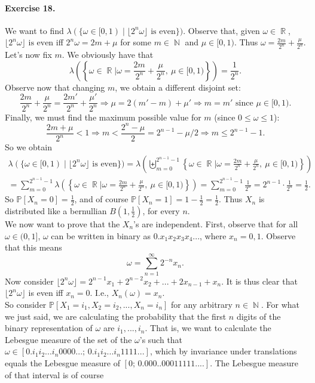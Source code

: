 \documentclass[12pt,a4paper]{report}
\theoremstyle{definition}
\theoremstyle{num.custom-title}
\DeclareMathOperator{\N}{\mathbb{N}}
\DeclareMathOperator{\R}{\mathbb{R}}
\DeclareMathOperator{\imp}{\Rightarrow}
\renewcommand{\P}{\mathbb{P}}
\renewcommand{\1}{\mathbbm{1}}
\begin{document}
\paragraph{Exercise 18.} We want to find $\lambda(\{\omega \in [0,1) \mid \lfloor 2^n \omega \rfloor \text{ is even}\})$. Observe that, given $\omega \in \R$, $\lfloor 2^n \omega \rfloor \text{ is even}$ iff $2^n \omega = 2m + \mu$ for some $m \in \N$ and $\mu \in [0,1)$. Thus $\omega = \frac{2m}{2^n} + \frac{\mu}{2^n}$. Let's now fix $m$. We obviously have that 
\[
\lambda \left( \left\{ \omega \in \R \Big | \omega = \frac{2m}{2^n} + \frac{\mu}{2^n}, \ \mu \in [0,1) \right\} \right) = \frac{1}{2^n}.
\]
Observe now that changing $m$, we obtain a different disjoint set:
\[
\frac{2m}{2^n} + \frac{\mu}{2^n} = \frac{2m'}{2^n} + \frac{\mu'}{2^n} \imp \mu = 2(m'-m) + \mu' \imp m=m' \text{ since } \mu \in [0,1).
\]
Finally, we must find the maximum possible value for $m$ (since $0 \leq \omega \leq 1$): 
\[
\frac{2m+\mu}{2^n} < 1 \imp m < \frac{2^n-\mu}{2} = 2^{n-1}-\mu/2 \imp m \leq 2^{n-1}-1.
\]
So we obtain 
\begin{multline*}
\lambda(\{\omega \in [0,1) \mid \lfloor 2^n \omega \rfloor \text{ is even}\}) = \lambda \left( \biguplus_{m=0}^{2^{n-1}-1} \left\{ \omega \in \R \Big | \omega = \frac{2m}{2^n} + \frac{\mu}{2^n}, \ \mu \in [0,1) \right\} \right)\\
= \sum_{m=0}^{2^{n-1}-1} \lambda \left( \left\{ \omega \in \R \Big | \omega = \frac{2m}{2^n} + \frac{\mu}{2^n}, \ \mu \in [0,1) \right\} \right) = \sum_{m=0}^{2^{n-1}-1} \frac{1}{2^n} = 2^{n-1} \cdot \frac{1}{2^n} = \frac{1}{2}.
\end{multline*}
So $\P[X_n = 0] = \frac{1}{2}$, and of course $\P[X_n = 1] = 1-\frac{1}{2} = \frac{1}{2}$. Thus $X_n$ is distributed like a bernullian $B(1,\frac{1}{2})$, for every $n$.\\
We now want to prove that the $X_n$'s are independent. First, observe that for all $\omega \in (0,1]$, $\omega$ can be written in binary as $0.x_1x_2x_3x_4...$, where $x_n=0,1$. Observe that this means 
\[
\omega = \sum_{n=1}^\infty 2^{-n} x_n.
\]
Now consider $\lfloor 2^n\omega \rfloor = 2^{n-1} x_1 + 2^{n-2} x_2 + ... + 2 x_{n-1} + x_n$. It is thus clear that $\lfloor 2^n\omega \rfloor$ is even iff $x_n=0$. I.e., $X_n(\omega) = x_n$.\\
So consider $\P[X_1=i_1, X_2=i_2,...,X_n=i_n]$ for any arbitrary $n \in \N$. For what we just said, we are calculating the probability that the first $n$ digits of the binary representation of $\omega$ are $i_1,...,i_n$. That is, we want to calculate the Lebesgue measure of the set of the $\omega$'s such that $\omega \in [0.i_1i_2...i_n0000...; \, 0.i_1i_2...i_n1111...]$, which by invariance under translations equals the Lebesgue measure of $[0; \, 0.000..00011111....]$. The Lebesgue measure of that interval is of course
\end{document}
